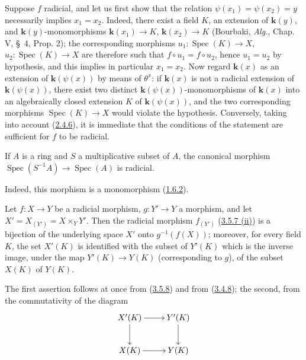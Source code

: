 Suppose $f$ radicial, and let us first show that the relation
$\psi(x_1)=\psi(x_2)=y$ necessarily implies $x_1=x_2$. Indeed, there
exist a field $K$, an extension of $\boldsymbol{k}(y)$, and $\boldsymbol{k}(y)$-monomorphisms
$\boldsymbol{k}(x_1)\to K$, $\boldsymbol{k}(x_2)\to K$ (Bourbaki, \emph{Alg.}, Chap. V, \S~4,
Prop. 2); the corresponding morphisms
$u_1:\operatorname{Spec}(K)\to X$, $u_2:\operatorname{Spec}(K)\to X$ are
therefore such that $f\circ u_1=f\circ u_2$, hence $u_1=u_2$ by hypothesis,
and this implies in particular $x_1=x_2$. Now regard $\boldsymbol{k}(x)$ as an
extension of $\boldsymbol{k}(\psi(x))$ by means of $\theta^x$: if $\boldsymbol{k}(x)$ is not a
radicial extension of $\boldsymbol{k}(\psi(x))$, there exist two distinct
$\boldsymbol{k}(\psi(x))$-monomorphisms of $\boldsymbol{k}(x)$ into an algebraically
closed extension $K$ of $\boldsymbol{k}(\psi(x))$, and the two corresponding morphisms
$\operatorname{Spec}(K)\to X$ would violate the hypothesis. Conversely, taking
into account (\hyperref[I.2.4.6]{2.4.6}), it is immediate that the
conditions of the statement are sufficient for $f$ to be radicial.

\begin{corollary}[3.5.9]
\label{I.3.5.9}
If $A$ is a ring and $S$ a multiplicative subset of $A$, the canonical
morphism $\operatorname{Spec}(S^{-1}A)\to\operatorname{Spec}(A)$ is
radicial.
\end{corollary}

Indeed, this morphism is a monomorphism
(\hyperref[I.1.6.2]{1.6.2}).

\begin{corollary}[3.5.10]
\label{I.3.5.10}
Let $f:X\to Y$ be a radicial morphism, $g:Y'\to Y$ a morphism, and let
$X'=X_{(Y')}=X\times_Y Y'$. Then the radicial morphism $f_{(Y')}$
\textup{(\hyperref[I.3.5.7]{3.5.7 (ii)})} is a bijection of the underlying space
$X'$ onto $g^{-1}(f(X))$; moreover, for every field $K$, the set $X'(K)$
is identified with the subset of $Y'(K)$ which is the inverse image, under the
map $Y'(K)\to Y(K)$ (corresponding to $g$), of the subset $X(K)$ of $Y(K)$.
\end{corollary}

The first assertion follows at once from
(\hyperref[I.3.5.8]{3.5.8}) and from
(\hyperref[I.3.4.8]{3.4.8}); the second, from the commutativity of the
diagram
\label{I.3.5.10.base-change-points-diagram}
\[
  \xymatrix{
    X'(K)\ar[r]\ar[d] & Y'(K)\ar[d]\\
    X(K)\ar[r] & Y(K)
  }
\]

